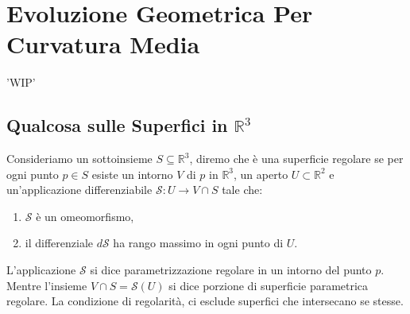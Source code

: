 \chapter{Evoluzione Geometrica Per Curvatura Media}
'WIP'
%
%
\section{Qualcosa sulle Superfici in $\mathbb{R}^3$}

Consideriamo un sottoinsieme $S\subseteq\mathbb{R}^3$, diremo che è una superficie regolare se per ogni punto $p\in S$ esiste un intorno $V$ di $p$ in $\mathbb{R}^3$, un aperto $U\subset\mathbb{R}^2$ e un'applicazione differenziabile $\mathcal{S}:U\longrightarrow V\cap S$ tale che:
\begin{enumerate}
  \item $\mathcal{S}$ è un omeomorfismo,
  \item il differenziale $d\mathcal{S}$ ha rango massimo in ogni punto di $U$.
\end{enumerate}
L'applicazione $\mathcal{S}$ si dice parametrizzazione regolare in un intorno del punto $p$. Mentre l'insieme $V\cap S=\mathcal{S}(U)$ si dice porzione di superficie parametrica regolare. La condizione di regolarità, ci esclude superfici che intersecano se stesse.


